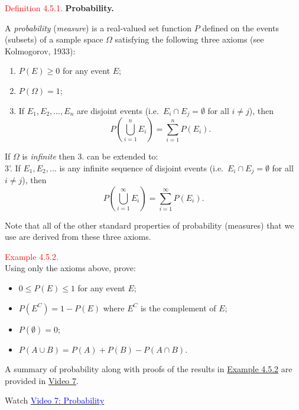 \documentclass[
]{book}
\providecommand{\tightlist}{%
  \setlength{\itemsep}{0pt}\setlength{\parskip}{0pt}}
\begin{document}
\leavevmode{}%
\textcolor{red}{Definition 4.5.1.}
{\textbf{Probability.}}

A \emph{probability} (\emph{measure}) is a real-valued set function \(P\) defined on the events (subsets) of a sample space \(\Omega\) satisfying the following three axioms (see Kolmogorov, 1933):

\begin{enumerate}
\def\labelenumi{\arabic{enumi}.}
\tightlist
\item
  \(P(E)\geq0\) for any event \(E\);
\item
  \(P(\Omega)=1\);
\item
  If \(E_1,E_2,\dots, E_n\) are disjoint events (i.e.~\(E_i \cap E_j = \emptyset\) for all \(i \neq j\)), then
  \[P \left( \bigcup_{i=1}^n E_i \right) = \sum_{i=1}^n P(E_i).\]
\end{enumerate}

If \(\Omega\) is \emph{infinite} then 3. can be extended to:\\
3'. If \(E_1,E_2,\dots\) is any infinite sequence of disjoint events (i.e.~\(E_i \cap E_j = \emptyset\) for all \(i\not=j\)), then
\[P \left( \bigcup_{i=1}^\infty E_i \right) = \sum_{i=1}^\infty P(E_i).\]

Note that all of the other standard properties of probability (measures) that we use are derived from these three axioms.

\leavevmode{}%
\textcolor{red}{Example 4.5.2.}\\
Using only the axioms above, prove:

\begin{itemize}
\item
  \(0 \leq P(E) \leq 1\) for any event \(E\);
\item
  \(P(E^C) = 1 - P(E)\) where \(E^C\) is the complement of \(E\);
\item
  \(P(\emptyset) = 0\);
\item
  \(P(A \cup B) = P(A) + P(B) - P(A \cap B)\).\\
\end{itemize}

A summary of probability along with proofs of the results in \protect\hyperlink{prob:exer:1}{Example 4.5.2} are provided in \protect\hyperlink{video7}{Video 7}.

Watch \href{https://mediaspace.nottingham.ac.uk/media/Probability+FINAL+VERSION/1_43tb6qxp}{\textcolor{blue}{Video 7: Probability}}
\end{document}
